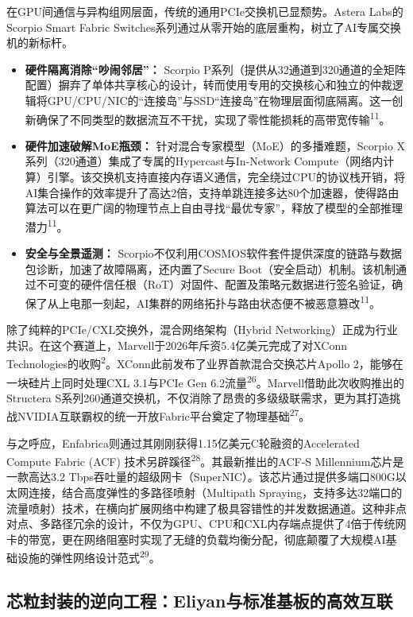 在GPU间通信与异构组网层面，传统的通用PCIe交换机已显颓势。Astera Labs的Scorpio Smart Fabric Switches系列通过从零开始的底层重构，树立了AI专属交换机的新标杆。

\begin{itemize}
  \item \textbf{硬件隔离消除``吵闹邻居''：} Scorpio P系列（提供从32通道到320通道的全矩阵配置）摒弃了单体共享核心的设计，转而使用专用的交换核心和独立的仲裁逻辑将GPU/CPU/NIC的``连接岛''与SSD``连接岛''在物理层面彻底隔离。这一创新确保了不同类型的数据流互不干扰，实现了零性能损耗的高带宽传输\textsuperscript{11}。
  \item \textbf{硬件加速破解MoE瓶颈：} 针对混合专家模型（MoE）的多播难题，Scorpio X系列（320通道）集成了专属的Hypercast与In-Network Compute（网络内计算）引擎。该交换机支持直接内存语义通信，完全绕过CPU的协议栈开销，将AI集合操作的效率提升了高达2倍，支持单跳连接多达80个加速器，使得路由算法可以在更广阔的物理节点上自由寻找``最优专家''，释放了模型的全部推理潜力\textsuperscript{11}。
  \item \textbf{安全与全景遥测：} Scorpio不仅利用COSMOS软件套件提供深度的链路与数据包诊断，加速了故障隔离，还内置了Secure Boot（安全启动）机制。该机制通过不可变的硬件信任根（RoT）对固件、配置及策略元数据进行签名验证，确保了从上电那一刻起，AI集群的网络拓扑与路由状态便不被恶意篡改\textsuperscript{11}。
\end{itemize}

除了纯粹的PCIe/CXL交换外，混合网络架构（Hybrid Networking）正成为行业共识。在这个赛道上，Marvell于2026年斥资5.4亿美元完成了对XConn Technologies的收购\textsuperscript{2}。XConn此前发布了业界首款混合交换芯片Apollo 2，能够在一块硅片上同时处理CXL 3.1与PCIe Gen 6.2流量\textsuperscript{26}。Marvell借助此次收购推出的Structera S系列260通道交换机，不仅消除了昂贵的多级级联需求，更为其打造挑战NVIDIA互联霸权的统一开放Fabric平台奠定了物理基础\textsuperscript{27}。

与之呼应，Enfabrica则通过其刚刚获得1.15亿美元C轮融资的Accelerated Compute Fabric (ACF) 技术另辟蹊径\textsuperscript{28}。其最新推出的ACF-S Millennium芯片是一款高达3.2 Tbps吞吐量的超级网卡（SuperNIC）。该芯片通过提供多端口800G以太网连接，结合高度弹性的多路径喷射（Multipath Spraying，支持多达32端口的流量喷射）技术，在横向扩展网络中构建了极具容错性的并发数据通道。这种非点对点、多路径冗余的设计，不仅为GPU、CPU和CXL内存端点提供了4倍于传统网卡的带宽，更在网络阻塞时实现了无缝的负载均衡分配，彻底颠覆了大规模AI基础设施的弹性网络设计范式\textsuperscript{29}。

\subsection{芯粒封装的逆向工程：Eliyan与标准基板的高效互联}


